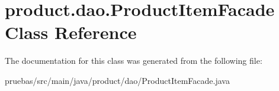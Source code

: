 \hypertarget{classproduct_1_1dao_1_1_product_item_facade}{}\section{product.\+dao.\+Product\+Item\+Facade Class Reference}
\label{classproduct_1_1dao_1_1_product_item_facade}


The documentation for this class was generated from the following file\+:\begin{DoxyCompactItemize}
\item 
pruebas/src/main/java/product/dao/Product\+Item\+Facade.\+java\end{DoxyCompactItemize}
